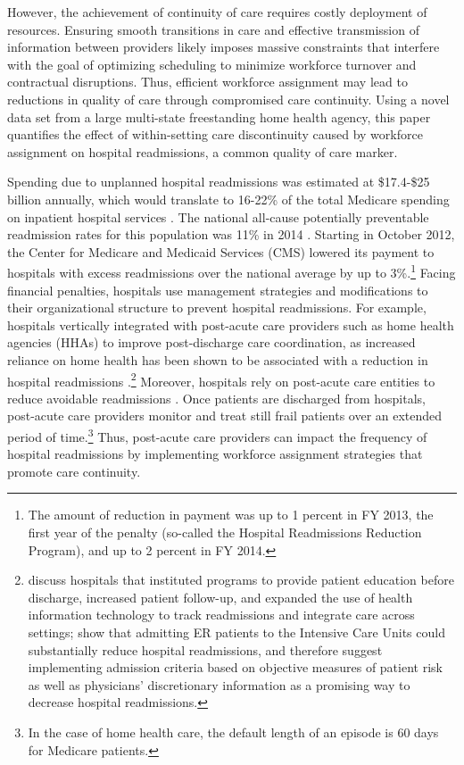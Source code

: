 \documentclass[final,12pt, notitlepage]{article}
\begin{document}
However, the achievement of continuity of care requires costly deployment of resources. Ensuring smooth transitions in care and effective transmission of information between providers likely imposes massive constraints that interfere with the goal of optimizing scheduling to minimize workforce turnover and contractual disruptions. Thus, efficient workforce assignment may lead to reductions in quality of care through compromised care continuity. Using a novel data set from a large multi-state freestanding home health agency, this paper quantifies the effect of within-setting care discontinuity caused by workforce assignment on hospital readmissions, a common quality of care marker.

Spending due to unplanned hospital readmissions was estimated at \$17.4-\$25 billion annually, which would translate to 16-22\% of the total Medicare spending on inpatient hospital services \citep{PricewaterhouseCooper2008, Jencks2009}.
The national all-cause potentially preventable readmission rates for this population was 11\% in 2014 \citep{MedPAC2016medicare}.
Starting in October 2012, the Center for Medicare and Medicaid Services (CMS) lowered its payment to hospitals with excess readmissions over the national average by up to 3\%.\footnote{The amount of reduction in payment was up to 1 percent in FY 2013, the first year of the penalty (so-called the Hospital Readmissions Reduction Program), and up to 2 percent in FY 2014.}
Facing financial penalties, hospitals use management strategies and modifications to their organizational structure to prevent hospital readmissions.
For example, hospitals vertically integrated with post-acute care providers such as home health agencies (HHAs) to improve post-discharge care coordination, as increased reliance on home health has been shown to be associated with a reduction in hospital readmissions \citep{Polsky2014}.\footnote{\citet{Naylor1999} discuss hospitals that instituted programs to provide patient education before discharge, increased patient follow-up, and expanded the use of health information technology to track readmissions and integrate care across settings; \citet{Kim2015} show that admitting ER patients to the Intensive Care Units could substantially reduce hospital readmissions, and therefore suggest implementing admission criteria based on objective measures of patient risk as well as physicians' discretionary information as a promising way to decrease hospital readmissions.
}
Moreover, hospitals rely on post-acute care entities to reduce avoidable readmissions \citep{Naylor2012}. Once patients are discharged from hospitals, post-acute care providers monitor and treat still frail patients over an extended period of time.\footnote{In the case of home health care, the default length of an episode is 60 days for Medicare patients.
}
Thus, post-acute care providers can impact the frequency of hospital readmissions by implementing workforce assignment strategies that promote care continuity.
\end{document}
